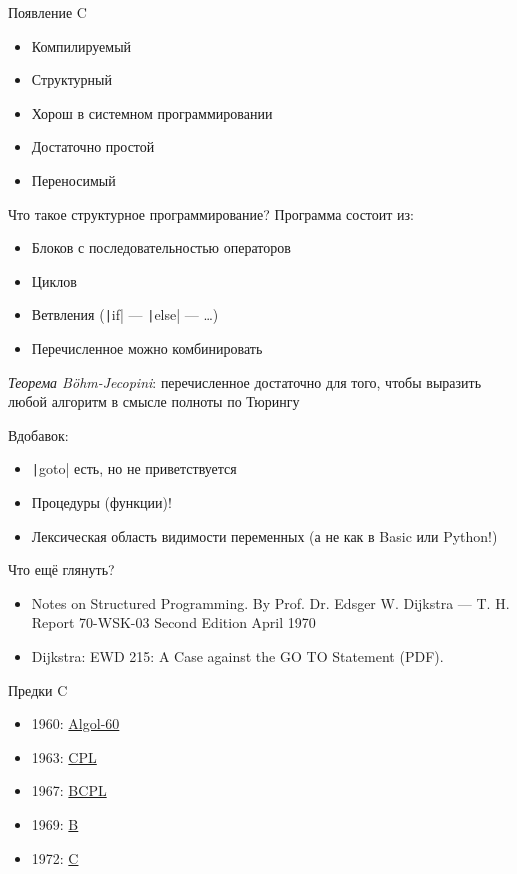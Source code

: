 \documentclass[xetex,aspectratio=169]{beamer}
\begin{document}
\begin{frame}{Появление C}
	\begin{itemize}
		\item Компилируемый
		\item Структурный
		\item Хорош в системном программировании
		\item Достаточно простой
        \item Переносимый
	\end{itemize}
\end{frame}

\begin{frame}{Что такое структурное программирование?}
	Программа состоит из:
	\begin{itemize}
		\item Блоков с последовательностью операторов
		\item Циклов
		\item Ветвления (\texttt|if| --- \texttt|else| --- \ldots)
		\item Перечисленное можно комбинировать
	\end{itemize}
	\pause

	\emph{Теорема B\"{o}hm-Jecopini}: перечисленное достаточно для того, чтобы выразить любой алгоритм в смысле полноты по Тюрингу
	\pause

	Вдобавок:
	\begin{itemize}
		\item \texttt|goto| есть, но не приветствуется
		\item Процедуры (функции)!
		\item Лексическая область видимости переменных (а не как в Basic или Python!)
	\end{itemize}
\end{frame}

\begin{frame}{Что ещё глянуть?}
	\begin{itemize}
		\item Notes on Structured Programming. By Prof. Dr. Edsger W. Dijkstra — T. H. Report 70-WSK-03 Second Edition April 1970
		\item Dijkstra: EWD 215: A Case against the GO TO Statement (PDF).
	\end{itemize}
\end{frame}

\begin{frame}{Предки C}
	\begin{itemize}
		\item 1960: \href{https://en.wikipedia.org/wiki/ALGOL_60\#Code_sample_comparisons}{Algol-60}
		\item 1963: \href{https://en.wikipedia.org/wiki/CPL_(programming_language)\#Example}{CPL}
		\item 1967: \href{https://en.wikipedia.org/wiki/BCPL\#Examples}{BCPL}
		\item 1969: \href{https://en.wikipedia.org/wiki/B_(programming_language)\#Examples}{B}
		\item 1972: \href{https://en.wikipedia.org/wiki/C_(programming_language)\#\%22Hello,_world\%22_example}{C}
	\end{itemize}
\end{frame}
\end{document}
